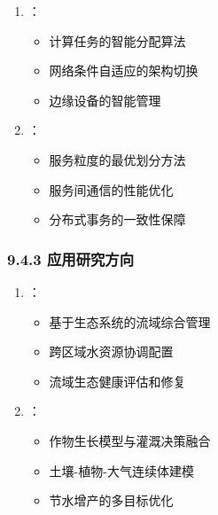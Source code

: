 
\begin{enumerate}
\def\labelenumi{\arabic{enumi}.}
\tightlist
\item
  ：

  \begin{itemize}
  \tightlist
  \item
    计算任务的智能分配算法
  \item
    网络条件自适应的架构切换
  \item
    边缘设备的智能管理
  \end{itemize}
\item
  ：

  \begin{itemize}
  \tightlist
  \item
    服务粒度的最优划分方法
  \item
    服务间通信的性能优化
  \item
    分布式事务的一致性保障
  \end{itemize}
\end{enumerate}

\hypertarget{ux5e94ux7528ux7814ux7a76ux65b9ux5411}{%
\subsubsection{9.4.3 应用研究方向}\label{ux5e94ux7528ux7814ux7a76ux65b9ux5411}}


\begin{enumerate}
\def\labelenumi{\arabic{enumi}.}
\tightlist
\item
  ：

  \begin{itemize}
  \tightlist
  \item
    基于生态系统的流域综合管理
  \item
    跨区域水资源协调配置
  \item
    流域生态健康评估和修复
  \end{itemize}
\item
  ：

  \begin{itemize}
  \tightlist
  \item
    作物生长模型与灌溉决策融合
  \item
    土壤-植物-大气连续体建模
  \item
    节水增产的多目标优化
  \end{itemize}
\end{enumerate}


